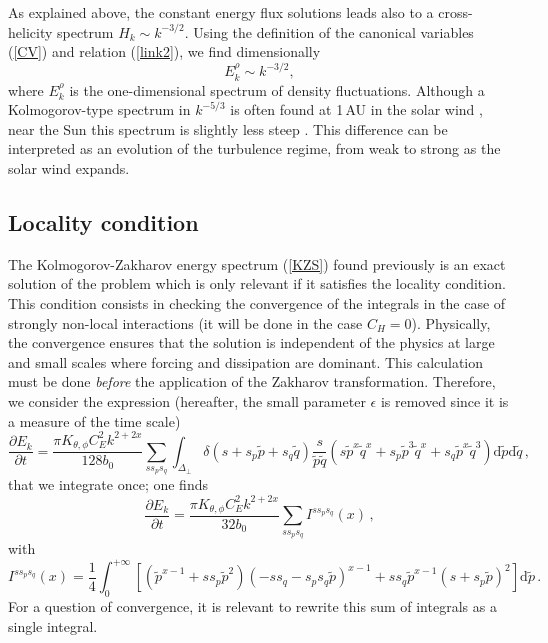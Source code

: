\documentclass{jpp}
\newcommand{\red}[1]{}
\def\be{\begin{equation}}
\def\ee{\end{equation}}
\def\dd{\mathrm{d}}
\begin{document}
As explained above, the constant energy flux solutions leads also to a cross-helicity spectrum $H_k \sim k^{-3/2}$. Using the definition of the canonical variables (\ref{CV}) and relation (\ref{link2}), we find dimensionally 
\be
E^{\rho}_k \sim k^{-3/2} ,
\ee
where $E^{\rho}_k$ is the one-dimensional spectrum of density fluctuations. Although a Kolmogorov-type spectrum in $k^{-5/3}$ is often found at 1\,AU in the solar wind \citep{Chen2014}, near the Sun this spectrum is slightly less steep \citep{Moncuquet2020}. This difference can be interpreted as an evolution of the turbulence regime, from weak to strong as the solar wind expands. 


\subsection{Locality condition}
The Kolmogorov-Zakharov energy spectrum (\ref{KZS}) found previously is an exact solution of the problem which is only relevant if it satisfies the locality condition. This condition consists in checking the convergence of the integrals in the case of strongly non-local interactions (it will be done in the case $C_H=0$). Physically, the convergence ensures that the solution is independent of the physics at large and small scales where forcing and dissipation are dominant. This calculation must be done {\it before} the application of the Zakharov transformation. Therefore, we consider the expression (hereafter, the small parameter $\epsilon$ is removed since it is a measure of the time scale) 
\be
\frac{\partial E_k}{\partial t} = 
\frac{\pi K_{\theta,\phi} C_E^2 k^{2+2x}}{128 b_0}  \sum_{ss_{p} s_{q}}  \int_{\Delta_\perp} 
\delta(s+s_p \tilde p+s_q \tilde q)\frac{s}{\tilde p \tilde q} 
\left( s {\tilde p}^x {\tilde q}^x + s_p {\tilde p}^3 {\tilde q}^x + s_q {\tilde p}^x {\tilde q}^3 \right)
\dd {\tilde p} \dd {\tilde q} \, ,  
\ee
that we integrate once; one finds
\be
\frac{\partial E_k}{\partial t} = 
\frac{\pi K_{\theta,\phi} C_E^2 k^{2+2x}}{32b_0} \sum_{ss_{p} s_{q}} I^{ss_ps_q}(x) \, ,
\ee
with
\be
I^{ss_ps_q}(x) = \frac{1}{4}\int_0^{+\infty} 
\left[ ({\tilde p}^{x-1} + s s_p{\tilde p}^2)(-ss_q -s_ps_q \tilde p)^{x-1} +ss_q {\tilde p}^{x-1} (s+s_p\tilde p)^2 \right] \dd {\tilde p} \, . 
\ee
For a question of convergence, it is relevant to rewrite this sum of integrals as a single integral. 
\red{First, we apply the following change of variables: $y=1/{\tilde p}$ for $I^{+-+}$, $y=1/({\tilde p}+1)$ for $I^{++-}$, and $y=p$ for $I^{+--}$; we obtain ($s=s_p=s_q$ being not allowed)}
\end{document}
